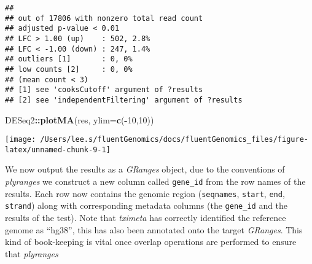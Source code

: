 \documentclass[
  9pt,
  a4paper,
]{extarticle}
\newenvironment{Shaded}{\begin{snugshade}}{\end{snugshade}}
\newcommand{\DataTypeTok}[1]{\textcolor[rgb]{0.13,0.29,0.53}{#1}}
\newcommand{\DecValTok}[1]{\textcolor[rgb]{0.00,0.00,0.81}{#1}}
\newcommand{\KeywordTok}[1]{\textcolor[rgb]{0.13,0.29,0.53}{\textbf{#1}}}
\newcommand{\NormalTok}[1]{#1}
\newcommand{\OperatorTok}[1]{\textcolor[rgb]{0.81,0.36,0.00}{\textbf{#1}}}
\newcommand{\StringTok}[1]{\textcolor[rgb]{0.31,0.60,0.02}{#1}}
\begin{document}
\begin{verbatim}
## 
## out of 17806 with nonzero total read count
## adjusted p-value < 0.01
## LFC > 1.00 (up)    : 502, 2.8%
## LFC < -1.00 (down) : 247, 1.4%
## outliers [1]       : 0, 0%
## low counts [2]     : 0, 0%
## (mean count < 3)
## [1] see 'cooksCutoff' argument of ?results
## [2] see 'independentFiltering' argument of ?results
\end{verbatim}

\begin{Shaded}
\begin{Highlighting}[]
\NormalTok{DESeq2}\OperatorTok{::}\KeywordTok{plotMA}\NormalTok{(res, }\DataTypeTok{ylim=}\KeywordTok{c}\NormalTok{(}\OperatorTok{-}\DecValTok{10}\NormalTok{,}\DecValTok{10}\NormalTok{))}
\end{Highlighting}
\end{Shaded}

\begin{center}\texttt{[image: /Users/lee.s/fluentGenomics/docs/fluentGenomics\_files/figure-latex/unnamed-chunk-9-1]} \end{center}

We now output the results as a \emph{GRanges} object, due to the conventions of
\emph{plyranges} we construct a new column called \texttt{gene\_id} from the row names of
the results. Each row now contains the genomic region (\texttt{seqnames}, \texttt{start},
\texttt{end}, \texttt{strand}) along with corresponding metadata columns (the \texttt{gene\_id} and
the results of the test). Note that \emph{tximeta} has correctly identified the
reference genome as ``hg38'', this has also been annotated onto the target
\emph{GRanges}. This kind of book-keeping is vital once overlap operations are
performed to ensure that \emph{plyranges}

\begin{Shaded}
\end{Shaded}
\end{document}
